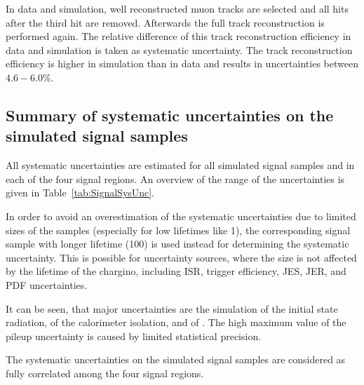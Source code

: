 In data and simulation, well reconstructed muon tracks are selected and all hits after the third hit are removed.
Afterwards the full track reconstruction is performed again.
The relative difference of this track reconstruction efficiency in data and simulation is taken as systematic uncertainty. %
The track reconstruction efficiency is higher in simulation than in data and results in uncertainties between $4.6-6.0\%$.\\


\subsection*{Summary of systematic uncertainties on the simulated signal samples}
All systematic uncertainties are estimated for all simulated signal samples and in each of the four signal regions.
An overview of the range of the uncertainties is given in Table~\ref{tab:SignalSysUnc}.

In order to avoid an overestimation of the systematic uncertainties due to limited sizes of the samples (especially for low lifetimes like 1\cm), the corresponding signal sample with longer lifetime (100\cm) is used instead for determining the systematic uncertainty.
This is possible for uncertainty sources, where the size is not affected by the lifetime of the chargino, including ISR, trigger efficiency, JES, JER, and PDF uncertainties.

It can be seen, that major uncertainties are the simulation of the initial state radiation, of the calorimeter isolation, and of \ias.
The high maximum value of the pileup uncertainty is caused by limited statistical precision.

The systematic uncertainties on the simulated signal samples are considered as fully correlated among the four signal regions.

